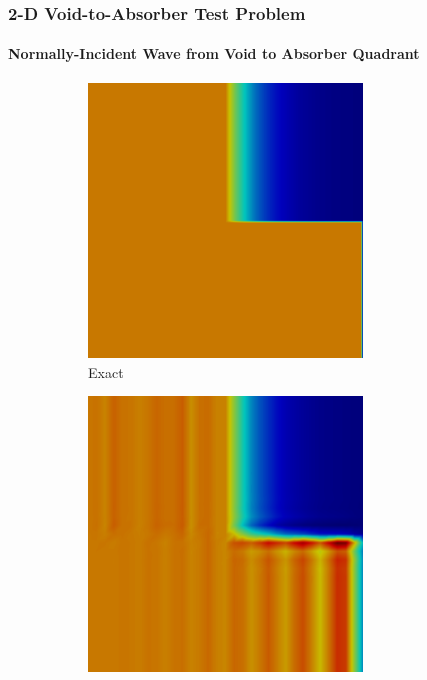 \begin{frame}
\frametitle{2-D Void-to-Absorber Test Problem}
\framesubtitle{Normally-Incident Wave from Void to Absorber Quadrant}

\begin{figure}[h]
   \centering
   \begin{subfigure}{0.3\textwidth}
      \centering
      \includegraphics[width=0.8\textwidth]{./figures/exact.png}
      \caption{Exact}
   \end{subfigure}
   \begin{subfigure}{0.3\textwidth}
      \centering
      \includegraphics[width=0.8\textwidth]{./figures/Gal.png}

\end{subfigure}
\end{figure}
\end{frame}
